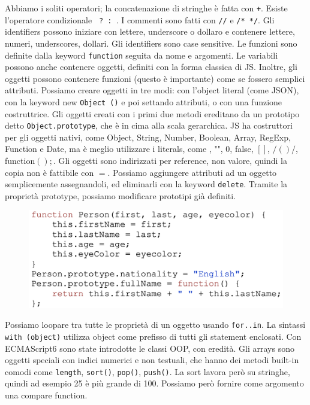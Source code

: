 \documentclass[11pt]{article}
\newcommand{\code}[1]{\texttt{#1}}
\begin{document}
Abbiamo i soliti operatori; la concatenazione di stringhe è fatta con \code{+}. Esiste l'operatore condizionale \code{ ? : }. I commenti sono fatti con \code{//} e \code{/* */}. Gli identifiers possono iniziare con lettere, underscore o dollaro e contenere lettere, numeri, underscores, dollari. Gli identifiers sono case sensitive. Le funzioni sono definite dalla keyword \code{function} seguita da nome e argomenti. Le variabili possono anche contenere oggetti, definiti con la forma classica di JS. Inoltre, gli oggetti possono contenere funzioni (questo è importante) come se fossero semplici attributi. Possiamo creare oggetti in tre modi: con l'object literal (come JSON), con la keyword new \code{Object ()} e poi settando attributi, o con una funzione costruttrice. Gli oggetti creati con i primi due metodi ereditano da un prototipo detto \code{Object.prototype}, che è in cima alla scala gerarchica. JS ha costruttori per gli oggetti nativi, come Object, String, Number, Boolean, Array, RegExp, Function e Date, ma è meglio utilizzare i literals, come \textbraceleft\textbraceright, "", 0, false, $[]$, $/()/$, function$(){};$. Gli oggetti sono indirizzati per reference, non valore, quindi la copia non è fattibile con $=$. Possiamo aggiungere attributi ad un oggetto semplicemente assegnandoli, ed eliminarli con la keyword \code{delete}. Tramite la proprietà prototype, possiamo modificare prototipi già definiti. 
\begin{figure}[H]
    \centering
    \includegraphics[width=0.4\linewidth]{res/prototype.png}
\end{figure}
Possiamo loopare tra tutte le proprietà di un oggetto usando \code{for..in}.
La sintassi \code{with (object)${}$} utilizza object come prefisso di tutti gli statement enclosati. Con ECMAScript6 sono state introdotte le classi OOP, con eredità. Gli arrays sono oggetti speciali con indici numerici e non testuali, che hanno dei metodi built-in comodi come \code{length}, \code{sort()}, \code{pop()}, \code{push()}. La sort lavora però su stringhe, quindi ad esempio 25 è più grande di 100. Possiamo però fornire come argomento una compare function. 
\end{document}
